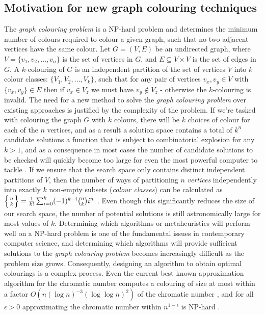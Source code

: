 \documentclass[12pt,a4paper]{article}
\begin{document}
\subsection*{Motivation for new graph colouring techniques}
\par The \textit{graph colouring problem} is a NP-hard problem and determines the minimum number of colours required to colour a given graph, such that no two adjacent vertices have the same colour. Let $G = (V, E)$ be an undirected graph, where $V = \{v_1, v_2, \dots , v_n \}$ is the set of vertices in $G$, and $E \subseteq V \times V$ is the set of edges in $G$. A $k$-colouring of $G$ is an independent partition of the set of vertices $V$ into $k$ colour classes: $\{V_1, V_2, \dots , V_k\}$, such that for any pair of vertices $v_x, v_y \in V$ with $\{v_x, v_y \} \in E$ then if $v_x \in V_z$ we must have $v_y \notin V_z$ - otherwise the $k$-colouring is invalid. The need for a new method to solve the \textit{graph colouring problem} over existing approaches is justified by the complexity of the problem. If we're tasked with colouring the graph $G$ with $k$ colours, there will be $k$ choices of colour for each of the $n$ vertices, and as a result a solution space contains a total of $k^n$ candidate solutions a function that is subject to combinatorial explosion for any $k>1$, and as a consequence in most cases the number of candidate solutions to be checked will quickly become too large for even the most powerful computer to tackle \cite{Marappan}. If we ensure that the search space only contains distinct independent partitions of $V$, then the number of ways of partitioning $n$ \textit{vertices} independently into exactly $k$ non-empty subsets (\textit{colour classes}) can be calculated as $ \Big\{ {n \atop k} \Big\} = \frac{1}{k!} \sum^k_{i=0} (-1)^{k-i} { n \choose k} i^n $ \cite{Lewis}. Even though this significantly reduces the size of our search space, the number of potential solutions is still astronomically large for most values of $k$.  Determining which algorithms or metaheuristics will perform well on a NP-hard problem is one of the fundamental issues in contemporary computer science, and determining which algorithms will provide sufficient solutions to the \textit{graph colouring problem} becomes increasingly difficult as the problem size grows. Consequently, designing an algorithm to obtain optimal colourings is a complex process. Even the current best known approximation algorithm for the chromatic number computes a colouring of size at most within a factor $O(n(\log n)^{-3}(\log \log n)^2)$ of the chromatic number \cite{Halldorsson}, and for all $\epsilon > 0$ approximating the chromatic number within $n^{1-\epsilon}$ is NP-hard \cite{Zuckerman}.
\end{document}
